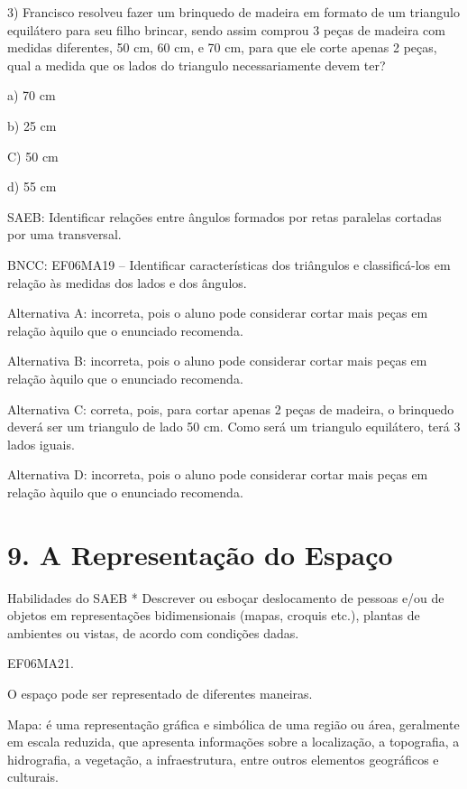 3) Francisco resolveu fazer um brinquedo de madeira em formato de um
triangulo equilátero para seu filho brincar, sendo assim comprou 3 peças
de madeira com medidas diferentes, 50 cm, 60 cm, e 70 cm, para que ele
corte apenas 2 peças, qual a medida que os lados do triangulo
necessariamente devem ter?

a) 70 cm

b) 25 cm

C) 50 cm

d) 55 cm

SAEB: Identificar relações entre ângulos formados por retas paralelas
cortadas por uma transversal.

BNCC: EF06MA19 -- Identificar características dos triângulos e
classificá-los em relação às medidas dos lados e dos ângulos.

Alternativa A: incorreta, pois o aluno pode considerar cortar mais peças
em relação àquilo que o enunciado recomenda.

Alternativa B: incorreta, pois o aluno pode considerar cortar mais peças
em relação àquilo que o enunciado recomenda.

Alternativa C: correta, pois, para cortar apenas 2 peças de madeira, o
brinquedo deverá ser um triangulo de lado 50 cm. Como será um triangulo
equilátero, terá 3 lados iguais.

Alternativa D: incorreta, pois o aluno pode considerar cortar mais peças
em relação àquilo que o enunciado recomenda.

\chapter{9. A Representação do
Espaço}

Habilidades do SAEB * Descrever ou esboçar deslocamento de pessoas e/ou
de objetos em representações bidimensionais (mapas, croquis etc.),
plantas de ambientes ou vistas, de acordo com condições dadas.


\begin{itemize}
EF06MA21.
\end{itemize}

O espaço pode ser representado de diferentes maneiras.

Mapa: é uma representação gráfica e simbólica de uma região ou área,
geralmente em escala reduzida, que apresenta informações sobre a
localização, a topografia, a hidrografia, a vegetação, a infraestrutura,
entre outros elementos geográficos e culturais.

